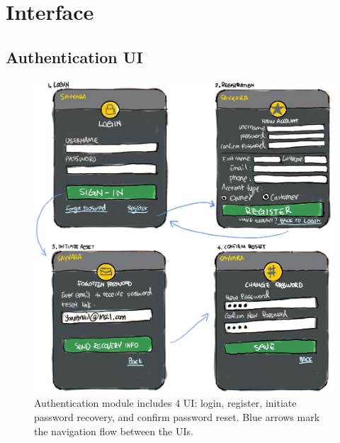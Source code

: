\documentclass[12pt, titlepage]{article}
\begin{document}
\newpage{}

\appendix


\section{Interface}
\subsection{Authentication UI}
\begin{figure}[H]
    \centering
    \includegraphics[width=\textwidth]{Design/SystDesign/ui_auth.png}
    \caption{Authentication module includes 4 UI: login, register, initiate password recovery, and confirm password reset. Blue arrows mark the navigation flow between the UIs.}
    \label{fig:authUI}
\end{figure}
\end{document}
